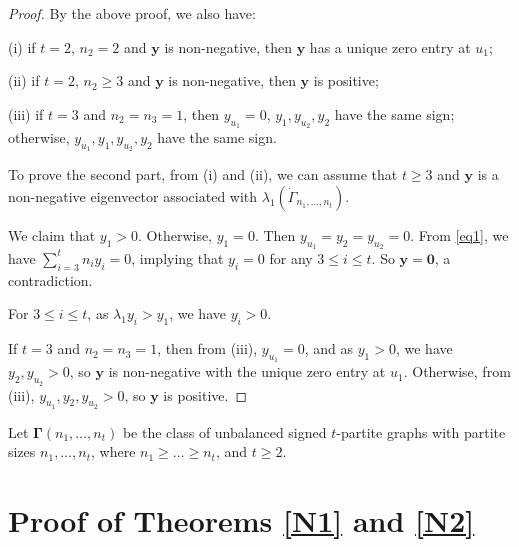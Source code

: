 \documentclass[12pt]{article}
\numberwithin{equation}{section}
\begin{document}
\begin{proof}
By the above proof, we also have: 

(i)  if $t=2$, $n_2=2$ and $\mathbf{y}$ is non-negative, then   $\mathbf{y}$ has a unique zero entry at $u_1$;

(ii)  if $t=2$, $n_2\ge 3$ and $\mathbf{y}$ is non-negative, then   $\mathbf{y}$ is positive;


(iii) if $t=3$ and $n_2=n_3=1$, then $y_{u_1}=0$, $y_1, y_{u_2}, y_2$ have the same sign; otherwise, $y_{u_1}, y_1, y_{u_2}, y_2$ have the same sign. 


To prove the second part, from (i) and (ii), we can assume that $t\ge 3$ and  $\mathbf{y}$ is a non-negative eigenvector associated with $\lambda_1(\dot\Gamma_{n_1, \dots, n_t})$.




We claim that  $y_1>0$. Otherwise,  $y_1=0$. 
Then $y_{u_1}=y_2=y_{u_2}=0$. 
From \eqref{eq1}, we have $\sum_{i=3}^tn_iy_i=0$, implying that $y_i=0$ for any $3\le i\le t$. 
So $\mathbf{y}=\mathbf{0}$, a contradiction. 


For  $3\le i\le t$, as $\lambda_1y_i>y_1$, we have $y_i>0$. 




If $t=3$ and $n_2=n_3=1$, then from (iii), $y_{u_1}=0$, and as $y_1>0$, we have $y_2, y_{u_2}>0$,  
so $\mathbf{y}$ is non-negative with the unique zero entry at $u_1$. 
Otherwise, from (iii), $y_{u_1}, y_2, y_{u_2}>0$, so $\mathbf{y}$ is positive. 
\end{proof}

Let $\boldsymbol\Gamma(n_1,\dots, n_t)$ be the class of unbalanced signed $t$-partite graphs  with partite sizes $n_1, \dots, n_t$, where $n_1\ge \dots\ge n_t$, and $t\ge 2$.


\section{Proof of Theorems \ref{N1} and \ref{N2}}
\end{document}
